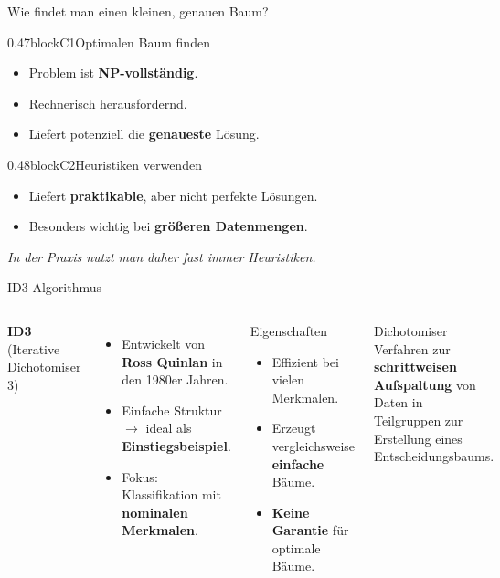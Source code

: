 \begin{frame}{Wie findet man einen kleinen, genauen Baum?}
\begin{blockrow}
\begin{blockcol}{0.47\textwidth}{blockC1}{Optimalen Baum finden}
\begin{itemize}
  \item Problem ist \textbf{NP-vollständig}.
  \item Rechnerisch herausfordernd.
  \item Liefert potenziell die \textbf{genaueste} Lösung.
\end{itemize}
\end{blockcol}

\begin{blockcol}{0.48\textwidth}{blockC2}{Heuristiken verwenden}
\begin{itemize}
  \item Liefert \textbf{praktikable}, aber nicht perfekte Lösungen.
  \item Besonders wichtig bei \textbf{größeren Datenmengen}.
\end{itemize}
\end{blockcol}
\end{blockrow}

\vspace{0.6em}
\centering
{\footnotesize\itshape In der Praxis nutzt man daher fast immer Heuristiken.}
\end{frame}


\begin{frame}{ID3-Algorithmus}
\begin{columns}
\textbf{ID3} (Iterative Dichotomiser 3)
\begin{itemize}
  \item Entwickelt von \textbf{Ross Quinlan} in den 1980er Jahren.
  \item Einfache Struktur $\rightarrow$ ideal als \textbf{Einstiegsbeispiel}.
  \item Fokus: Klassifikation mit \textbf{nominalen Merkmalen}.
\end{itemize}

\vspace{0.4em}
\begin{blockC1}{Eigenschaften}
\begin{itemize}
  \item Effizient bei vielen Merkmalen.
  \item Erzeugt vergleichsweise \textbf{einfache} Bäume.
  \item \textbf{Keine Garantie} für optimale Bäume.
\end{itemize}
\end{blockC1}

\begin{blockDef}{Dichotomiser}
Verfahren zur \textbf{schrittweisen Aufspaltung} von Daten in Teilgruppen
zur Erstellung eines Entscheidungsbaums.
\end{blockDef}
\end{columns}
\end{frame}

